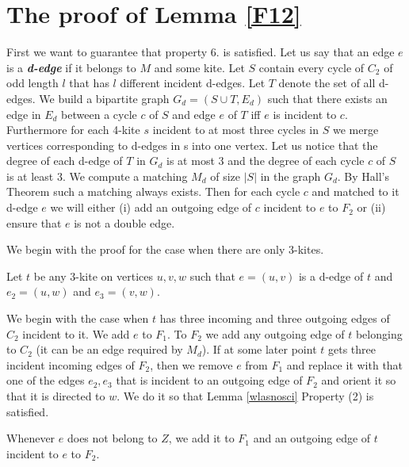 \documentclass[a4, 11pt]{article}
\newcommand{\<}{\langle}
\renewcommand{\>}{\rangle}
\begin{document}
\section{The proof of Lemma \ref{F12}} \label{dowodf12}
First we want to guarantee that property 6. is satisfied. Let us say that an edge $e$ is a {\bf \em d-edge} if it belongs to $M$ and some kite. Let $S$ contain every cycle of $C_2$ of odd length $l$ that has $l$ different incident d-edges. Let $T$ denote the set of all d-edges.
We build a bipartite graph $G_d=(S \cup T, E_d)$ such that there exists an edge in $E_d$ between a cycle $c$ of $S$ and  edge $e$ of $T$ iff $e$ is incident to $c$. Furthermore for each 4-kite $s$ incident to at most three cycles in $S$ we merge vertices corresponding to d-edges in s into one vertex. Let us notice that the degree of each d-edge of $T$ in $G_d$ is at most $3$ and the degree of each cycle $c$ of $S$ is at least $3$. We compute a matching $M_d$ of size $|S|$ in the graph $G_d$. By Hall's Theorem such a matching always exists. Then for each cycle $c$ and matched to it d-edge $e$ we will either (i) add an outgoing edge of $c$ incident to $e$ to $F_2$ or (ii) ensure that $e$ is not a double edge. 

We begin with the proof for the case when there are only $3$-kites. 

Let $t$ be any $3$-kite on vertices $u,v,w$ such that $e=(u,v)$ is a d-edge of $t$ and $e_2=(u,w)$ and $e_3=(v,w)$. 


We begin with the case when $t$ has three incoming and three outgoing edges of $C_2$ incident to it. We add $e$ to $F_1$. To $F_2$ we add any outgoing edge of $t$ belonging to $C_2$ (it can be an edge required by $M_d$).  If at some later point $t$ gets three incident incoming edges of $F_2$, then we remove $e$ from $F_1$ and replace it with that one of the edges $e_2, e_3$ that is incident to an outgoing edge of $F_2$ and orient it so that it is directed to $w$. We do it so that Lemma \ref{wlasnosci} Property (2) is satisfied.

Whenever $e$ does not belong to $Z$, we add it to $F_1$ and an outgoing edge of $t$ incident to $e$ to $F_2$.
\end{document}
